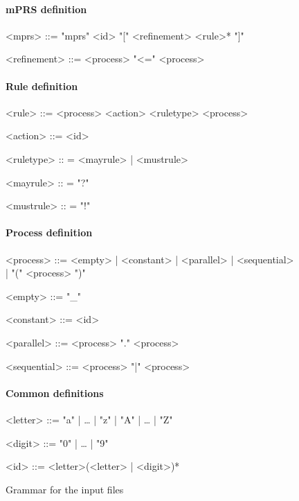 \begin{figure}
\paragraph{mPRS definition}
\begin{grammar}
<mprs> ::= "mprs" <id> "[" <refinement> <rule>* "]"

<refinement> ::= <process> "<=" <process>

\end{grammar}

\paragraph{Rule definition}
\begin{grammar}
<rule> ::= <process> <action> <ruletype> <process>

<action> ::= <id>

<ruletype> :: = <mayrule> | <mustrule>

<mayrule> :: = "?"

<mustrule> :: = "!"
\end{grammar}

\paragraph{Process definition}
\begin{grammar}
<process> ::= <empty> | <constant> | <parallel> | <sequential> | "(" <process> ")"

<empty> ::= "_"

<constant> ::= <id>

<parallel> ::= <process> "." <process>

<sequential> ::= <process> "|" <process>
\end{grammar}

\paragraph{Common definitions}
\begin{grammar}
<letter> ::= "a" | … | "z" | "A" | … | "Z"

<digit> ::= "0" | …  | "9"

<id> ::= <letter>(<letter> | <digit>)*
\end{grammar}
\caption{Grammar for the input files}
\label{fig:grammar}
\end{figure}

\newpage %

